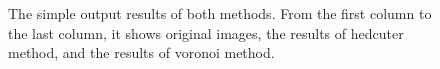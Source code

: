 \documentclass[11pt]{article}
\begin{document}
\begin{figure}[bt]
 \centering
  \hspace{-3mm}
  \hspace{-3mm}
    \caption{The simple output results of both methods. From the first column to the last column, it shows original images, the results of hedcuter method, and the results of voronoi method. \label{fig:simple_results2}}
\end{figure}
\end{document}
